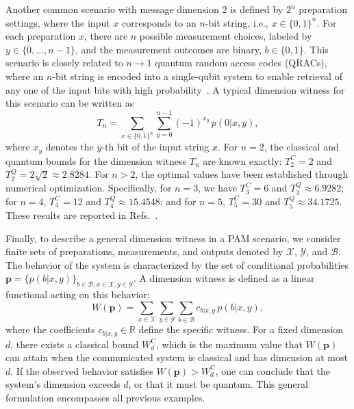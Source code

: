 \documentclass[aps,pra,reprint, superscriptaddress,showkeys]{revtex4-2}
\theoremstyle{plain}
\begin{document}
Another common scenario with message dimension 2 is defined by \(2^n\) preparation settings, where the input \(x\) corresponds to an \(n\)-bit string, i.e., \(x \in \{0,1\}^n\). For each preparation \(x\), there are \(n\) possible measurement choices, labeled by \(y \in \{0, \ldots, n-1\}\), and the measurement outcomes are binary, \(b \in \{0,1\}\). This scenario is closely related to \(n \rightarrow 1\) quantum random access codes (QRACs), where an \(n\)-bit string is encoded into a single-qubit system to enable retrieval of any one of the input bits with high probability~\cite{pawlowski2011, li2011, li2012, Ambainis2008}. A typical dimension witness for this scenario can be written as
\begin{equation}
    T_n = \sum_{x \in \{0,1\}^n} \sum_{y=0}^{n-1} (-1)^{x_y}\,p(0|x,y),
    \label{eq: pam_Tn}
\end{equation}
where \(x_y\) denotes the \(y\)-th bit of the input string \(x\). For \(n=2\), the classical and quantum bounds for the dimension witness \(T_n\) are known exactly: 
\(T_2^C = 2\) and \(T_2^Q = 2\sqrt{2} \approx 2.8284\). 
For \(n > 2\), the optimal values have been established through numerical optimization. Specifically, for \(n=3\), we have \(T_3^C = 6\) and \(T_3^Q \approx 6.9282\); for \(n=4\), \(T_4^C = 12\) and \(T_4^Q \approx 15.4548\); and for \(n=5\), \(T_5^C = 30\) and \(T_5^Q \approx 34.1725\). These results are reported in Refs.~\cite{Ambainis2008, li2012}.

Finally, to describe a general dimension witness in a PAM scenario, we consider finite sets of preparations, measurements, and outputs denoted by \(\mathcal{X}\), \(\mathcal{Y}\), and \(\mathcal{B}\). The behavior of the system is characterized by the set of conditional probabilities \(\mathbf{p} = \{p(b|x,y)\}_{b \in \mathcal{B}, x \in \mathcal{X}, y \in \mathcal{Y}}\). A dimension witness is defined as a linear functional acting on this behavior:
\begin{equation}
    W(\mathbf{p}) = \sum_{x \in \mathcal{X}} \sum_{y \in \mathcal{Y}} \sum_{b \in \mathcal{B}} c_{b|x,y}\, p(b|x,y),
    \label{eq:PAM_W}
\end{equation}
where the coefficients \( c_{b|x,y} \in \mathbb{R} \) define the specific witness. For a fixed dimension \( d \), there exists a classical bound \( W_d^{\mathrm{C}} \), which is the maximum value that \( W(\mathbf{p}) \) can attain when the communicated system is classical and has dimension at most \( d \). If the observed behavior satisfies \( W(\mathbf{p}) > W_d^{\mathrm{C}} \), one can conclude that the system's dimension exceeds \( d \), or that it must be quantum. This general formulation encompasses all previous examples.
\end{document}
